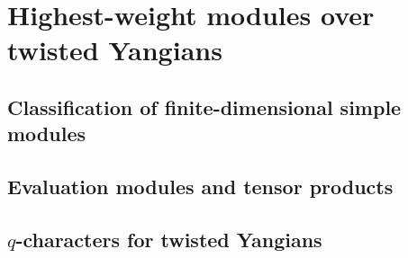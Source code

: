 \section{Highest-weight modules over twisted Yangians} \label{section: highest_weight_modules_for_twisted_yangians}
    \subsection{Classification of finite-dimensional simple modules}

    \subsection{Evaluation modules and tensor products}

    \subsection{\texorpdfstring{$q$}{}-characters for twisted Yangians}